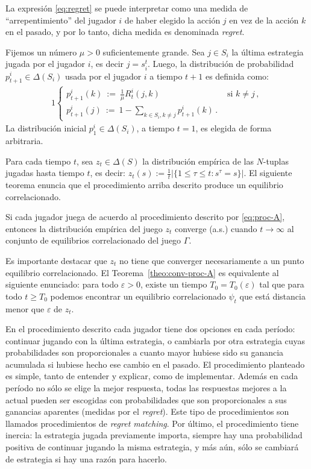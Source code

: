 La expresión \eqref{eq:regret} se puede interpretar como una medida de ``arrepentimiento'' del jugador $i$ de haber elegido la acción $j$ en vez de la acción $k$ en el pasado, y por lo tanto, dicha medida es denominada \textit{regret}.

Fijemos un número $\mu > 0$ suficientemente grande. Sea $j \in S_i$ la última estrategia jugada por el jugador $i$, es decir $j = s_i^t$. Luego, la distribución de probabilidad $p_{t+1}^i \in \Delta(S_i)$ usada por el jugador $i$ a tiempo $t+1$ es definida como:
\begin{alignat}{1}
\label{eq:proc-A}
  \begin{cases}
    p_{t+1}^i(k)\ :=\  \frac{1}{\mu} R_t^i(j, k) & \text{ si } k \neq j \,, \\
    p_{t+1}^i(j)\ :=\ 1 - \sum_{k \in S_i, k \neq j} p_{t+1}^i(k) \,.
  \end{cases}
\end{alignat}
La distribución inicial $p_{1}^i \in \Delta(S_i)$, a tiempo $t=1$, es elegida de forma arbitraria.

Para cada tiempo $t$, sea $z_t \in \Delta(S)$ la distribución empírica de las $N$-tuplas jugadas hasta tiempo $t$, es decir:
$z_t(s) := \frac{1}{t} |\{1\leq\tau \leq t : s^{\tau} = s \}|$. El siguiente teorema enuncia que el procedimiento arriba descrito produce un equilibrio correlacionado.

\begin{theorem}
\label{theo:conv-proc-A}
Si cada jugador juega de acuerdo al procedimiento descrito por \eqref{eq:proc-A}, entonces la distribución empírica del juego $z_t$ converge (a.s.) cuando $t \rightarrow \infty$ al conjunto de equilibrios correlacionado del juego $\Gamma$.
\end{theorem}

Es importante destacar que $z_t$ no tiene que converger necesariamente a un punto equilibrio correlacionado. El Teorema~\ref{theo:conv-proc-A} es equivalente al siguiente enunciado: para todo $\varepsilon > 0$, existe un tiempo $T_0 = T_0(\varepsilon)$ tal que para todo $t \geq T_0$ podemos encontrar un equilibrio correlacionado $\psi_t$ que está distancia menor que $\varepsilon$ de $z_t$.

En el procedimiento descrito cada jugador tiene dos opciones en cada período: continuar jugando con la última estrategia, o cambiarla por otra estrategia cuyas probabilidades son proporcionales a cuanto mayor hubiese sido su ganancia acumulada si hubiese hecho ese cambio en el pasado. El procedimiento planteado es simple, tanto de entender y explicar, como de implementar. Además en cada período no sólo se elige la mejor respuesta, todas las respuestas mejores a la actual pueden ser escogidas con probabilidades que son proporcionales a sus ganancias aparentes (medidas por el \textit{regret}). Este tipo de procedimientos son llamados procedimientos de \textit{regret matching}. Por último, el procedimiento tiene inercia: la estrategia jugada previamente importa, siempre hay una probabilidad positiva de continuar jugando la misma estrategia, y más aún, sólo se cambiará de estrategia si hay una razón para hacerlo.

